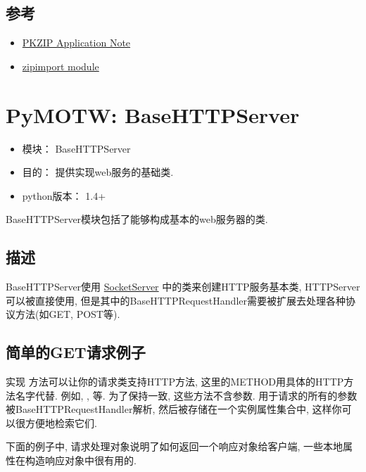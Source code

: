 \documentclass[a4paper,10pt,english]{manual}
\begin{document}
\section{参考}
\begin{itemize}
\item {} 
\href{http://www.pkware.com/business\_and\_developers/developer/appnote/}{PKZIP Application Note}

\item {} 
\href{http://docs.python.org/lib/module-zipimport.html}{zipimport module}

\end{itemize}

\resetcurrentobjects


\chapter{PyMOTW: BaseHTTPServer}
\begin{itemize}
\item {} 
模块： BaseHTTPServer

\item {} 
目的： 提供实现web服务的基础类.

\item {} 
python版本： 1.4+

\end{itemize}

BaseHTTPServer模块包括了能够构成基本的web服务器的类.


\section{描述}

BaseHTTPServer使用 \href{http://docs.python.org/lib/module-SocketServer.html}{SocketServer} 中的类来创建HTTP服务基本类, HTTPServer可以被直接使用, 但是其中的BaseHTTPRequestHandler需要被扩展去处理各种协议方法(如GET, POST等).


\section{简单的GET请求例子}

实现  方法可以让你的请求类支持HTTP方法, 这里的METHOD用具体的HTTP方法名字代替. 例如, ,  等. 为了保持一致, 这些方法不含参数. 用于请求的所有的参数被BaseHTTPRequestHandler解析, 然后被存储在一个实例属性集合中, 这样你可以很方便地检索它们.

下面的例子中, 请求处理对象说明了如何返回一个响应对象给客户端, 一些本地属性在构造响应对象中很有用的.
\end{document}
